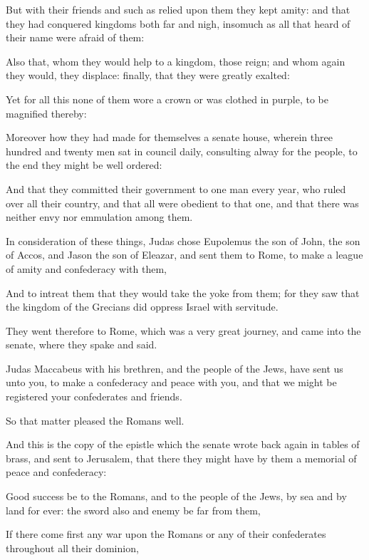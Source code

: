 {\par }{\PP {}But with their friends and such as relied upon them they kept amity: and that they had conquered kingdoms both far and nigh, insomuch as all that heard of their name were afraid of them:
\par }{\PP {}Also that, whom they would help to a kingdom, those reign; and whom again they would, they displace: finally, that they were greatly exalted:
\par }{\PP {}Yet for all this none of them wore a crown or was clothed in purple, to be magnified thereby:
\par }{\PP {}Moreover how they had made for themselves a senate house, wherein three hundred and twenty men sat in council daily, consulting alway for the people, to the end they might be well ordered:
\par }{\PP {}And that they committed their government to one man every year, who ruled over all their country, and that all were obedient to that one, and that there was neither envy nor emmulation among them.
\par }{\PP {}In consideration of these things, Judas chose Eupolemus the son of John, the son of Accos, and Jason the son of Eleazar, and sent them to Rome, to make a league of amity and confederacy with them,
\par }{\PP {}And to intreat them that they would take the yoke from them; for they saw that the kingdom of the Grecians did oppress Israel with servitude.
\par }{\PP {}They went therefore to Rome, which was a very great journey, and came into the senate, where they spake and said.
\par }{\PP {}Judas Maccabeus with his brethren, and the people of the Jews, have sent us unto you, to make a confederacy and peace with you, and that we might be registered your confederates and friends.
\par }{\PP {}So that matter pleased the Romans well.
\par }{\PP {}And this is the copy of the epistle which the senate wrote back again in tables of brass, and sent to Jerusalem, that there they might have by them a memorial of peace and confederacy:
\par }{\PP {}Good success be to the Romans, and to the people of the Jews, by sea and by land for ever: the sword also and enemy be far from them,
\par }{\PP {}If there come first any war upon the Romans or any of their confederates throughout all their dominion,
}
